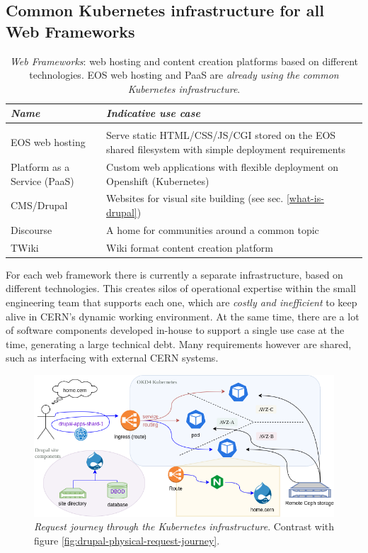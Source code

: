 \subsection{Common Kubernetes infrastructure for all Web Frameworks}
\label{sec-web-frameworks}

\begin{table}[h!]
\begin{tabularx}{\textwidth}{ p{10em}| >{\raggedright\arraybackslash}X}
    \emph{Name} & \emph{Indicative use case} \\
    \hline \\
    EOS web hosting & Serve static HTML/CSS/JS/CGI stored on the EOS shared filesystem with simple deployment requirements \\
    Platform as a Service (PaaS) & Custom web applications with flexible deployment on Openshift (Kubernetes) \\
    CMS/Drupal & Websites for visual site building (see sec. \ref{what-is-drupal}) \\
    Discourse & A home for communities around a common topic \\
    TWiki & Wiki format content creation platform
\end{tabularx}
\caption{\emph{Web Frameworks}: web hosting and content creation platforms based on different technologies.
EOS web hosting and PaaS are \emph{already using the common Kubernetes infrastructure}.}
\vspace{-1.8em}
\label{tab-wf}
\end{table}

For each web framework there is currently a separate infrastructure, based on different technologies.
This creates silos of operational expertise within the small engineering team that supports each one, which are \emph{costly and inefficient} to keep alive in CERN's dynamic working environment.
At the same time, there are a lot of software components developed in-house to support a single use case at the time, generating a large technical debt.
Many requirements however are shared, such as interfacing with external CERN systems.

\begin{figure}
    \vspace{-1em}
    \centering
    \hspace{-1.8em}
    \includegraphics[width=.66\textwidth]{figures/drupal-k8s-request-journey}
    \caption{\emph{Request journey through the Kubernetes infrastructure}. Contrast with figure \ref{fig:drupal-physical-request-journey}.}
    \vspace{-2em}
    \label{fig:drupal-k8s-request-journey}
\end{figure}


